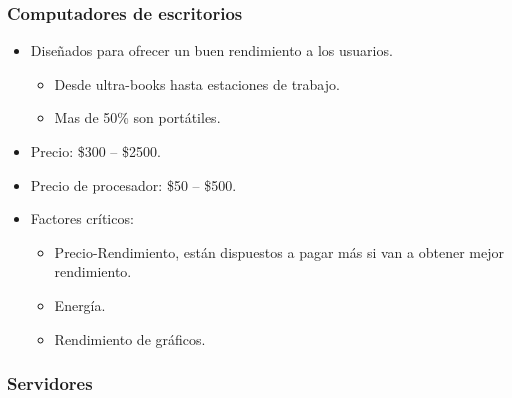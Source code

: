\documentclass[12pt, twoside, openright]{report} %
\begin{document}
    \subsubsection{Computadores de escritorios}

    \begin{itemize}
    
    \item
      Diseñados para ofrecer un buen rendimiento a los usuarios.

      \begin{itemize}
      
      \item
        Desde ultra-books hasta estaciones de trabajo.
      \item
        Mas de 50\% son portátiles.
      \end{itemize}
    \item
      Precio: \$300 -- \$2500.
    \item
      Precio de procesador: \$50 -- \$500.
    \item
      Factores críticos:

      \begin{itemize}
      
      \item
        Precio-Rendimiento, están dispuestos a pagar más si van a
        obtener mejor rendimiento.
      \item
        Energía.
      \item
        Rendimiento de gráficos.
      \end{itemize}
    \end{itemize}
    \subsubsection{Servidores}
\end{document}
